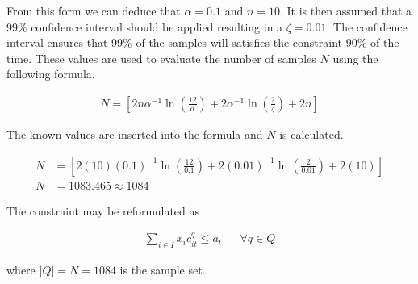 \documentclass[a4paper,11pt]{article}
\begin{document}
From this form we can deduce that $\alpha = 0.1$ and $n= 10$. It is then assumed that a 99\% confidence interval should be applied resulting in a $\zeta = 0.01$. The confidence interval ensures that 99\% of the samples will satisfies the constraint 90\% of the time. These values are used to evaluate the number of samples $N$ using the following formula.

\begin{align}
	N=[ 2n\alpha^{-1}\ln(\frac{12}{\alpha}) + 2\alpha^{-1}\ln(\frac{2}{\zeta})+2n]
	\label{q1eqN}
\end{align}

The known values are inserted into the formula and $N$ is calculated.

\begin{align}
	N&=[ 2(10)(0.1)^{-1}\ln(\frac{12}{0.1}) + 2(0.01)^{-1}\ln(\frac{2}{0.01})+2(10)]\\
	N& = 1083.465 \approx 1084
\end{align}

The constraint may be reformulated as 

\begin{align}
	\sum_{i\in I} x_ic^{q}_{it} \leq a_t && \forall q\in Q
\end{align}

where $|Q| = N = 1084$ is the sample set.
\end{document}
